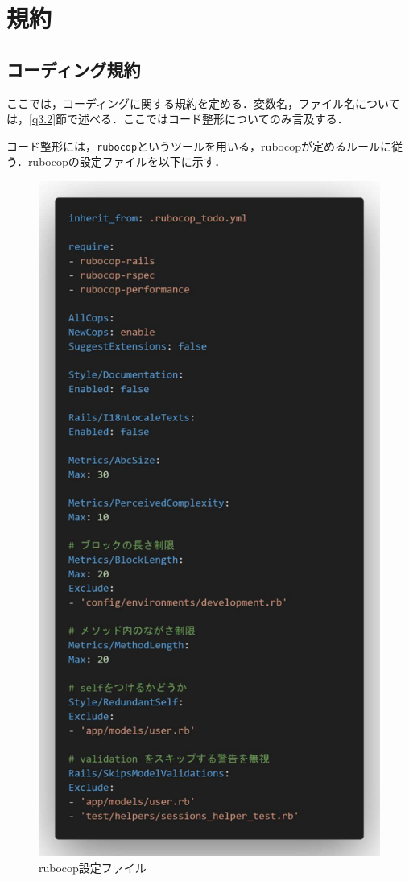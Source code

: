 \chapter{規約}
\section{コーディング規約}\label{q3.1}
ここでは，コーディングに関する規約を定める．変数名，ファイル名については，\ref{q3.2}節で述べる．ここではコード整形についてのみ言及する．

コード整形には，\texttt{rubocop}というツールを用いる，rubocopが定めるルールに従う．rubocopの設定ファイルを以下に示す．

\begin{figure}[htbp]
    \centering
    \includegraphics[scale=0.4]{img/etc/rubocop.pdf}
    \caption{rubocop設定ファイル}
    \label{rubocop}
\end{figure}

